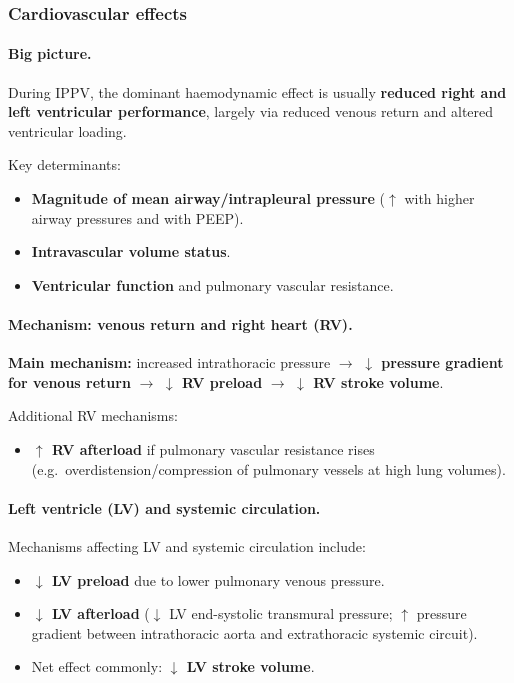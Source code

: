 \documentclass[11pt,a4paper]{article}
\begin{document}
\subsubsection{Cardiovascular effects}

\paragraph{Big picture.}
During IPPV, the dominant haemodynamic effect is usually \textbf{reduced right and left ventricular performance}, largely via reduced venous return and altered ventricular loading.

Key determinants:
\begin{itemize}
  \item \textbf{Magnitude of mean airway/intrapleural pressure} ($\uparrow$ with higher airway pressures and with PEEP).
  \item \textbf{Intravascular volume status}.
  \item \textbf{Ventricular function} and pulmonary vascular resistance.
\end{itemize}

\paragraph{Mechanism: venous return and right heart (RV).}
\textbf{Main mechanism:} increased intrathoracic pressure $\rightarrow$ \textbf{$\downarrow$ pressure gradient for venous return} $\rightarrow$ \textbf{$\downarrow$ RV preload} $\rightarrow$ \textbf{$\downarrow$ RV stroke volume}.

Additional RV mechanisms:
\begin{itemize}
  \item \textbf{$\uparrow$ RV afterload} if pulmonary vascular resistance rises (e.g.\ overdistension/compression of pulmonary vessels at high lung volumes).
\end{itemize}

\paragraph{Left ventricle (LV) and systemic circulation.}
Mechanisms affecting LV and systemic circulation include:
\begin{itemize}
  \item \textbf{$\downarrow$ LV preload} due to lower pulmonary venous pressure.
  \item \textbf{$\downarrow$ LV afterload} ($\downarrow$ LV end-systolic transmural pressure; $\uparrow$ pressure gradient between intrathoracic aorta and extrathoracic systemic circuit).
  \item Net effect commonly: \textbf{$\downarrow$ LV stroke volume}.
\end{itemize}
\end{document}
